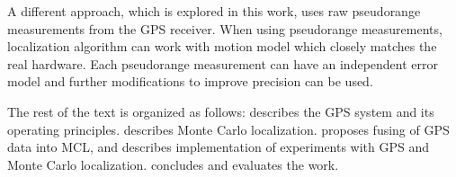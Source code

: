A different approach, which is explored in this work, uses raw
pseudorange measurements from the GPS receiver.
When using pseudorange measurements, localization algorithm can work with motion model
which closely matches the real hardware.
Each pseudorange measurement can have an
independent error model and further modifications to improve precision can be used.


\vspace{1.5em}




The rest of the text is organized as follows:
 describes the GPS system and its operating principles.
 describes Monte Carlo localization.
 proposes fusing of GPS data into MCL, and
 describes implementation of experiments with GPS and
Monte Carlo localization.
 concludes and evaluates the work.
